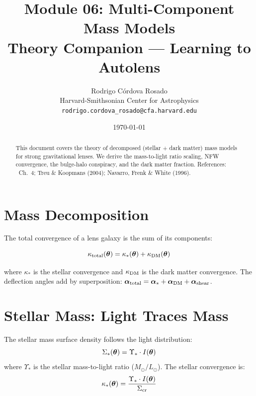 \documentclass[11pt, letterpaper]{article}
\title{\textbf{Module 06: Multi-Component Mass Models}\\[0.5em]
\large Theory Companion --- Learning to Autolens}
\author{Rodrigo C\'ordova Rosado\\
\small Harvard-Smithsonian Center for Astrophysics\\
\small \texttt{rodrigo.cordova\_rosado@cfa.harvard.edu}}
\date{\today}
\begin{document}
\maketitle

\begin{abstract}
This document covers the theory of decomposed (stellar + dark matter) mass
models for strong gravitational lenses. We derive the mass-to-light ratio
scaling, NFW convergence, the bulge-halo conspiracy, and the dark matter
fraction. References: \CK\ Ch.~4; Treu \& Koopmans (2004);
Navarro, Frenk \& White (1996).
\end{abstract}

\tableofcontents
\newpage

\section{Mass Decomposition}
\label{sec:decomposition}

The total convergence of a lens galaxy is the sum of its components:
\begin{keyresult}
\begin{equation}
\kappa_{\rm total}(\bm{\theta}) = \kappa_*(\bm{\theta}) + \kappa_{\rm DM}(\bm{\theta})
\label{eq:kappa-total}
\end{equation}
\end{keyresult}

\noindent where $\kappa_*$ is the stellar convergence and $\kappa_{\rm DM}$ is
the dark matter convergence. The deflection angles add by superposition:
$\bm{\alpha}_{\rm total} = \bm{\alpha}_* + \bm{\alpha}_{\rm DM} + \bm{\alpha}_{\rm shear}$.

\section{Stellar Mass: Light Traces Mass}
\label{sec:stellar}

The stellar mass surface density follows the light distribution:
\begin{equation}
\Sigma_*(\bm{\theta}) = \Upsilon_* \cdot I(\bm{\theta})
\label{eq:mass-to-light}
\end{equation}
where $\Upsilon_*$ is the stellar mass-to-light ratio ($M_\odot/L_\odot$).
The stellar convergence is:
\begin{equation}
\kappa_*(\bm{\theta}) = \frac{\Upsilon_* \cdot I(\bm{\theta})}{\Sigma_{\rm cr}}
\label{eq:kappa-stellar}
\end{equation}
\end{document}
